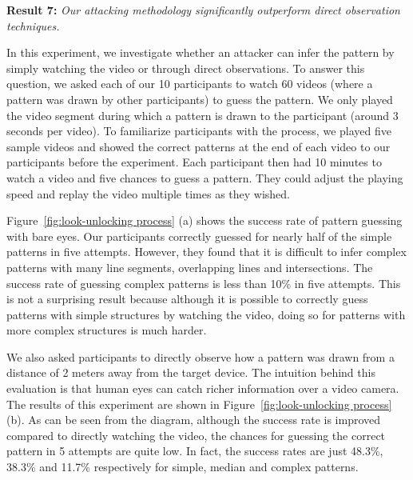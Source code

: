     \noindent \textbf{Result 7:} \emph{Our attacking methodology significantly outperform direct observation techniques.}

   In this experiment, we investigate whether an attacker can infer the pattern by
   simply watching the video or through direct observations. To answer this question, we asked each of our 10 participants to watch 60 videos (where
   a pattern was drawn by other participants) to guess the pattern.  We
    only played the video segment during which a pattern is drawn to the participant (around 3 seconds per video).
   To familiarize participants with the process, we
    played  five sample videos and showed the correct patterns at the end of each video to our participants before the experiment.
   Each participant then had 10 minutes to watch a video and five chances to guess a pattern. They could adjust the playing speed and
   replay the video multiple times as they wished.


        Figure~\ref{fig:look-unlocking process} (a) shows the success rate of pattern guessing with
        bare eyes. Our participants correctly guessed for nearly half of the
        simple patterns in five attempts. However, they found that it is difficult
        to infer complex patterns with many line segments, overlapping lines and intersections.
        The success rate of guessing complex patterns is less than 10\% in five attempts.
        This is not a surprising result
        because although it is possible to correctly guess patterns with
        simple structures by watching the video, doing so for patterns with
        more complex structures is much harder.


    We also asked participants to directly observe how a pattern was drawn
    from a distance of 2 meters away from the target device. The intuition
    behind this evaluation is that human eyes can catch richer information
    over a video camera. The results of this experiment are shown in
    Figure~\ref{fig:look-unlocking process} (b).  As can be seen from the
    diagram, although the success rate is improved compared to directly watching the video, the chances for guessing the correct pattern in
    5 attempts are quite low. In
    fact, the success rates are just 48.3\%, 38.3\%
    and 11.7\% respectively for simple, median and complex patterns.

